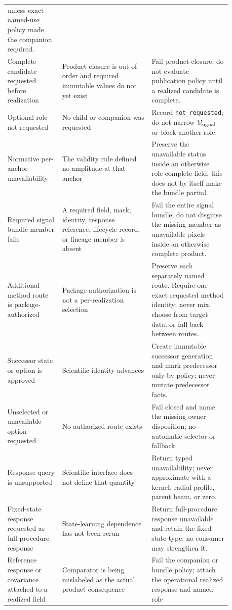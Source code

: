 \begin{longtable}{p{0.22\linewidth}p{0.36\linewidth}p{0.32\linewidth}}
\Complete{} unless exact named-use policy made the companion required. \\
Complete candidate requested before realization & Product closure is out of
order and required immutable values do not yet exist & Fail product closure;
do not evaluate publication policy until a realized candidate is complete. \\
Optional role not requested & No child or companion was requested & Record
\texttt{not\_requested}; do not narrow $\mathcal{V}_{\rm signal}$ or block another
role. \\
Normative per-anchor unavailability & The validity rule defined no amplitude at
that anchor & Preserve the unavailable status inside an otherwise role-complete
field; this does not by itself make the bundle partial. \\
Required signal bundle member fails & A required field, mask, identity,
response reference, lifecycle record, or lineage member is absent & Fail the
entire signal bundle; do not disguise the missing member as unavailable pixels
inside an otherwise complete product. \\
Additional method route is package-authorized & Package authorization is not a
per-realization selection & Preserve each separately named route. Require one
exact requested method identity; never mix, choose from target data, or fall
back between routes. \\
Successor state or option is approved & Scientific identity advances & Create
immutable successor generation and mark predecessor \Superseded{} only by
policy; never mutate predecessor facts. \\
Unselected or unavailable option requested & No authorized route exists & Fail
closed and name the missing owner disposition; no automatic selector or
fallback. \\
Response query is unsupported & Scientific interface does not define that
quantity & Return typed unavailability; never approximate with a kernel,
radial profile, parent beam, or zero. \\
Fixed-state response requested as full-procedure response & State-learning
dependence has not been rerun & Return full-procedure response unavailable and
retain the fixed-state type; no consumer may strengthen it. \\
Reference response or covariance attached to a realized field & Comparator is
being mislabeled as the actual product consequence & Fail the companion or
bundle policy; attach the operational realized response and named-role

\end{longtable}

